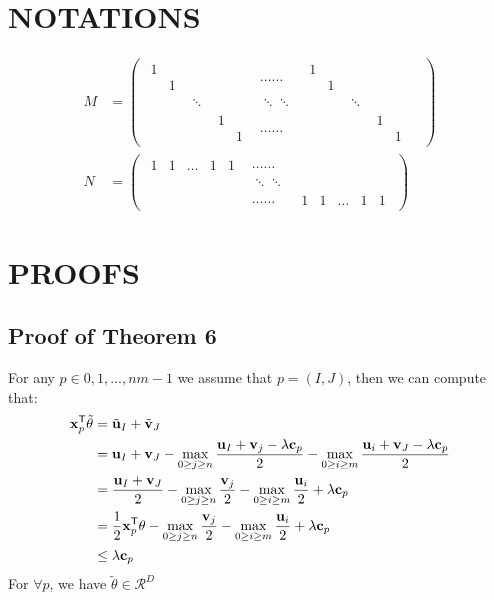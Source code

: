 \section{NOTATIONS}
\begin{align}
M &= 
\begin{pmatrix}
\begin{matrix} 1&\\&1 \end{matrix}& & &\dots\dots&\begin{matrix} 1&\\&1 \end{matrix}& & \\
&\ddots& & \ddots\ddots & & \ddots & & \\
& &\begin{matrix} 1&\\&1 \end{matrix}& \dots\dots& & &\begin{matrix} 1&\\&1 \end{matrix}
\end{pmatrix}\\
N &= 
\begin{pmatrix}
\begin{matrix} 1&1&\dots&1&1\end{matrix} &\dots\dots \\
&\ddots\ddots&\\
&\dots\dots & \begin{matrix} 1&1&\dots&1&1\end{matrix}
\end{pmatrix}
\end{align}
\section{PROOFS}
\subsection{Proof of Theorem 6}
For any $p \in {0,1,...,nm -1}$ we assume that $p = (I,J)$, then we can compute that:
 \begin{equation}
\begin{split} 
\mathbf{x}_p^{\mathsf T}\tilde{\theta} &= \tilde{\mathbf u}_{I} + \tilde{\mathbf v}_J \\
				    &= {\mathbf u}_{I} + {\mathbf v}_J - \max_{0\geq j\geq n} \frac{{\mathbf u}_I +{\mathbf v}_j - \lambda \mathbf c_{p}}{2} - \max_{0 \geq i \geq m} \frac{{\mathbf u}_i +{\mathbf v}_J - \lambda \mathbf c_{p}}{2}\\
				    &= \frac{{\mathbf u}_{I} + {\mathbf v}_J}{2} - \max_{0\geq j\geq n} \frac{{\mathbf v}_j}{2} - \max_{0 \geq i \geq m} \frac{{\mathbf u}_i }{2} + \lambda \mathbf c_{p}\\
				    &= \frac{1}{2}\mathbf{x}_p^{\mathsf T}{\theta} - \max_{0\geq j\geq n} \frac{{\mathbf v}_j}{2} - \max_{0 \geq i \geq m} \frac{{\mathbf u}_i }{2} +\lambda \mathbf c_{p} \\
				    &\leq \lambda \mathbf c_{p} 
 \end{split} 
\end{equation}
For $\forall p$, we have $\tilde{\theta} \in \mathcal{R}^{D}$

